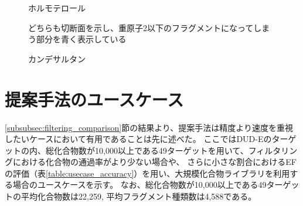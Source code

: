 \begin{figure}[t]
\begin{minipage}{0.5\hsize}
 \begin{center}
  \caption{ホルモテロール}
  \label{fig:ZINC02599970}
 \end{center}
\end{minipage}
\begin{minipage}{0.5\hsize}
 \begin{center}
  \caption{カンデサルタン}
  \label{fig:ZINC03782818}
 \end{center}
\end{minipage}
\begin{center}
どちらも切断面を示し、重原子2以下のフラグメントになってしまう部分を青く表示している
\end{center}
\end{figure}


\section{提案手法のユースケース}
\ref{subsubsec:filtering_comparison}節の結果より、提案手法は精度より速度を重視したいケースにおいて有用であることは先に述べた。
ここではDUD-Eのターゲットの内、総化合物数が10,000以上である49ターゲットを用いて、フィルタリングにおける化合物の通過率がより少ない場合や、
さらに小さな割合におけるEFの評価（表\ref{table:usecase_accuracy}）を用い、大規模化合物ライブラリを利用する場合のユースケースを示す。
なお、総化合物数が10,000以上である49ターゲットの平均化合物数は22,259, 平均フラグメント種類数は4,588である。

